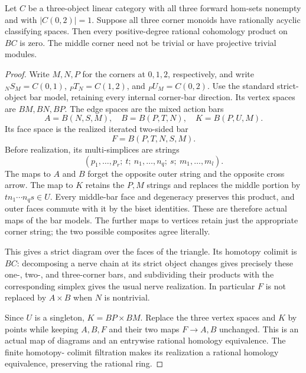 \begin{theorem}
\label{C:singleton-long-acyclic-corners}
Let $C$ be a three-object linear category with all three
forward hom-sets nonempty and with $|C(0,2)|=1$.
Suppose all three corner monoids have rationally acyclic
classifying spaces.  Then every positive-degree rational
cohomology product on $BC$ is zero.  The middle corner
need not be trivial or have projective trivial modules.
\end{theorem}
\begin{proof}
Write $M,N,P$ for the corners at $0,1,2$, respectively,
and write ${}_NS_M=C(0,1)$, ${}_PT_N=C(1,2)$,
and ${}_PU_M=C(0,2)$.  Use the standard strict-object
bar model, retaining every internal corner-bar direction.
Its vertex spaces are $BM,BN,BP$.  The edge spaces are
the mixed action bars
\[
 A=B(N,S,M),\quad B=B(P,T,N),\quad K=B(P,U,M).
\]
Its face space is the realized iterated two-sided bar
\[
 F=B(P,T,N,S,M).
\]
Before realization, its multi-simplices are strings
\[
 (p_1,\ldots,p_r;\ t;\ n_1,\ldots,n_q;\ s;\
                                      m_1,\ldots,m_l).
\]
The maps to $A$ and $B$ forget the opposite outer string
and the opposite cross arrow.  The map to $K$ retains
the $P,M$ strings and replaces the middle portion by
$t n_1\cdots n_q s\in U$.  Every middle-bar face and
degeneracy preserves this product, and outer faces
commute with it by the biset identities.  These are
therefore actual maps of the bar models.  The further
maps to vertices retain just the appropriate corner
string; the two possible composites agree literally.

This gives a strict diagram over the faces of the
triangle.  Its homotopy colimit is $BC$: decomposing a
nerve chain at its strict object changes gives precisely
these one-, two-, and three-corner bars, and subdividing
their products with the corresponding simplex gives
the usual nerve realization.  In particular $F$ is
not replaced by $A\times B$ when $N$ is nontrivial.

Since $U$ is a singleton, $K=BP\times BM$.  Replace
the three vertex spaces and $K$ by points while keeping
$A,B,F$ and their two maps $F\to A,B$ unchanged.
This is an actual map of diagrams and an entrywise
rational homology equivalence.  The finite homotopy-
colimit filtration makes its realization a rational
homology equivalence, preserving the rational ring.


\end{proof}
